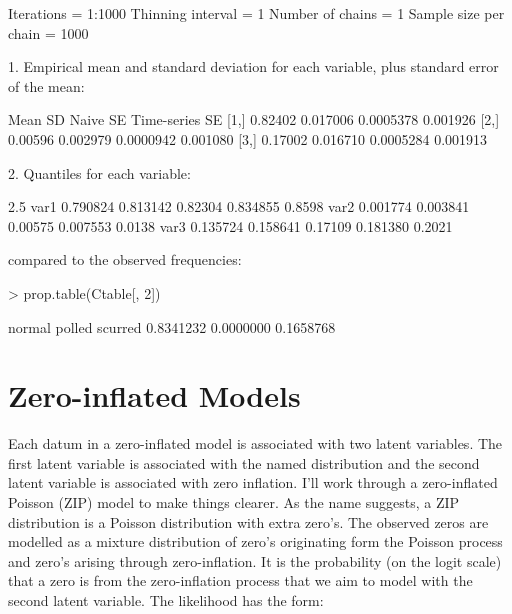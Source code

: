 \documentclass{article}
\begin{document}
\begin{Schunk}
\begin{Soutput}
Iterations = 1:1000
Thinning interval = 1 
Number of chains = 1 
Sample size per chain = 1000 

1. Empirical mean and standard deviation for each variable,
   plus standard error of the mean:

        Mean       SD  Naive SE Time-series SE
[1,] 0.82402 0.017006 0.0005378       0.001926
[2,] 0.00596 0.002979 0.0000942       0.001080
[3,] 0.17002 0.016710 0.0005284       0.001913

2. Quantiles for each variable:

         2.5%
var1 0.790824 0.813142 0.82304 0.834855 0.8598
var2 0.001774 0.003841 0.00575 0.007553 0.0138
var3 0.135724 0.158641 0.17109 0.181380 0.2021
\end{Soutput}
\end{Schunk}

compared to the observed frequencies:

\begin{Schunk}
\begin{Sinput}
> prop.table(Ctable[, 2])
\end{Sinput}
\begin{Soutput}
   normal    polled   scurred 
0.8341232 0.0000000 0.1658768 
\end{Soutput}
\end{Schunk}


\section{Zero-inflated Models}

Each datum in a zero-inflated model is associated with two latent variables. The first latent variable is associated with the named distribution and the second latent variable is associated with zero inflation. I'll work through a zero-inflated Poisson (ZIP) model to make things clearer. As the name suggests, a ZIP distribution is a Poisson distribution with extra zero's. The observed zeros are modelled as a mixture distribution of zero's originating form the Poisson process and zero's arising through zero-inflation. It is the probability (on the logit scale) that a zero is from the zero-inflation process that we aim to model with the second latent variable. The likelihood has the form:
\end{document}
